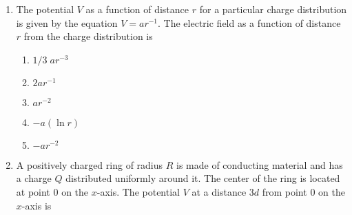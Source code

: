 \documentclass{../../../oss-apphys}
\begin{document}
\begin{multicols}{2}
\begin{enumerate}[leftmargin=18pt,resume]
    \columnbreak
    
  \item The potential $V$ as a function of distance $r$ for a particular charge
    distribution is given by the equation $V=ar^{-1}$. The electric field as
    a function of distance $r$ from the charge distribution is
    \begin{enumerate}[noitemsep,topsep=0pt,leftmargin=18pt,label=(\Alph*)]
    \item $1/3\;ar^{-3}$
    \item $2ar^{-1}$
    \item $ar^{−2}$
    \item $−a(\ln r)$
    \item $−ar^{-2}$
    \end{enumerate}
    
  \item A positively charged ring of radius $R$ is made of conducting material
    and has a charge $Q$ distributed uniformly around it. The center of the
    ring is located at point $0$ on the $x$-axis. The potential $V$ at a
    distance $3d$ from point $0$ on the $x$-axis is
    \begin{center}
      \vspace{-.1in}
    \end{center}


\end{enumerate}
\end{multicols}
\end{document}
